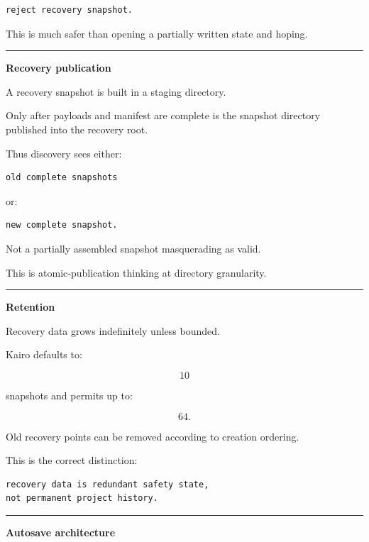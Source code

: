 \begin{verbatim}
reject recovery snapshot.
\end{verbatim}

This is much safer than opening a partially written state and hoping.

\begin{center}\rule{0.5\linewidth}{0.5pt}\end{center}

\textbf{Recovery publication}

A recovery snapshot is built in a staging directory.

Only after payloads and manifest are complete is the snapshot directory published into the recovery root.

Thus discovery sees either:

\begin{verbatim}
old complete snapshots
\end{verbatim}

or:

\begin{verbatim}
new complete snapshot.
\end{verbatim}

Not a partially assembled snapshot masquerading as valid.

This is atomic-publication thinking at directory granularity.

\begin{center}\rule{0.5\linewidth}{0.5pt}\end{center}

\textbf{Retention}

Recovery data grows indefinitely unless bounded.

Kairo defaults to:

\[
10
\]

snapshots and permits up to:

\[
64.
\]

Old recovery points can be removed according to creation ordering.

This is the correct distinction:

\begin{verbatim}
recovery data is redundant safety state,
not permanent project history.
\end{verbatim}

\begin{center}\rule{0.5\linewidth}{0.5pt}\end{center}

\textbf{Autosave architecture}

